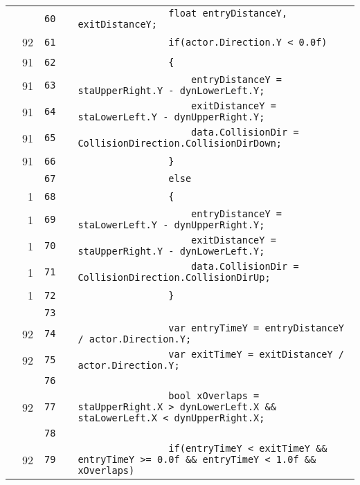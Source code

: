 \documentclass[a4paper,landscape,10pt]{article}
\begin{document}
\begin{longtable}[l]{lrrll}
\cellcolor{gray} &  & \verb~60~ & & \verb~                float entryDistanceY, exitDistanceY;~\\
\cellcolor{green} & 92 & \verb~61~ & & \verb~                if(actor.Direction.Y < 0.0f)~\\
\cellcolor{green} & 91 & \verb~62~ & & \verb~                {~\\
\cellcolor{green} & 91 & \verb~63~ & & \verb~                    entryDistanceY = staUpperRight.Y - dynLowerLeft.Y;~\\
\cellcolor{green} & 91 & \verb~64~ & & \verb~                    exitDistanceY = staLowerLeft.Y - dynUpperRight.Y;~\\
\cellcolor{green} & 91 & \verb~65~ & & \verb~                    data.CollisionDir = CollisionDirection.CollisionDirDown;~\\
\cellcolor{green} & 91 & \verb~66~ & & \verb~                }~\\
\cellcolor{gray} &  & \verb~67~ & & \verb~                else~\\
\cellcolor{green} & 1 & \verb~68~ & & \verb~                {~\\
\cellcolor{green} & 1 & \verb~69~ & & \verb~                    entryDistanceY = staLowerLeft.Y - dynUpperRight.Y;~\\
\cellcolor{green} & 1 & \verb~70~ & & \verb~                    exitDistanceY = staUpperRight.Y - dynLowerLeft.Y;~\\
\cellcolor{green} & 1 & \verb~71~ & & \verb~                    data.CollisionDir = CollisionDirection.CollisionDirUp;~\\
\cellcolor{green} & 1 & \verb~72~ & & \verb~                }~\\
\cellcolor{gray} &  & \verb~73~ & & \verb~~\\
\cellcolor{green} & 92 & \verb~74~ & & \verb~                var entryTimeY = entryDistanceY / actor.Direction.Y;~\\
\cellcolor{green} & 92 & \verb~75~ & & \verb~                var exitTimeY = exitDistanceY / actor.Direction.Y;~\\
\cellcolor{gray} &  & \verb~76~ & & \verb~~\\
\cellcolor{orange} & 92 & \verb~77~ & & \verb~                bool xOverlaps = staUpperRight.X > dynLowerLeft.X && staLowerLeft.X < dynUpperRight.X;~\\
\cellcolor{gray} &  & \verb~78~ & & \verb~~\\
\cellcolor{green} & 92 & \verb~79~ & & \verb~                if(entryTimeY < exitTimeY && entryTimeY >= 0.0f && entryTimeY < 1.0f && xOverlaps)~\\

\end{longtable}
\end{document}
